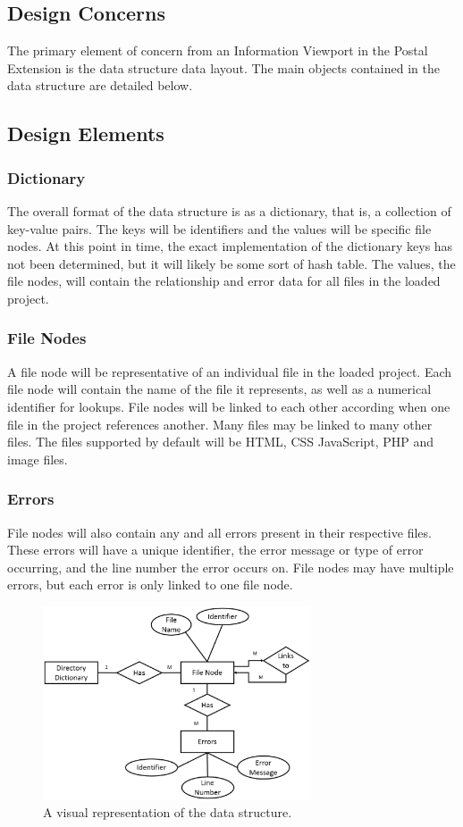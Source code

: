 \documentclass[letterpaper,10pt,titlepage,draftclsnofoot,onecolumn,onesided] {IEEEtran}
\begin{document}
\subsection{Design Concerns}
The primary element of concern from an Information Viewport in the Postal Extension is the data structure data layout. 
The main objects contained in the data structure are detailed below.
\subsection{Design Elements}

	\subsubsection{Dictionary}
	The overall format of the data structure is as a dictionary, that is, a collection of key-value pairs. 
	The keys will be identifiers and the values will be specific file nodes. 
	At this point in time, the exact implementation of the dictionary keys has not been determined, but it will likely be some sort of hash table.
	The values, the file nodes, will contain the relationship and error data for all files in the loaded project.
	\subsubsection{File Nodes}
		A file node will be representative of an individual file in the loaded project. 
		Each file node will contain the name of the file it represents, as well as a numerical identifier for lookups.
		File nodes will be linked to each other according when one file in the project references another. 
		Many files may be linked to many other files.
		The files supported by default will be HTML, CSS JavaScript, PHP and image files.
		
	\subsubsection{Errors}
		File nodes will also contain any and all errors present in their respective files.
		These errors will have a unique identifier, the error message or type of error occurring, and the line number the error occurs on.
		File nodes may have multiple errors, but each error is only linked to one file node.

	\begin{figure}
        \includegraphics[width=300px]{InformationERDEPS.eps}
        \caption{A visual representation of the data structure.}
    \end{figure}
		
\end{document}
